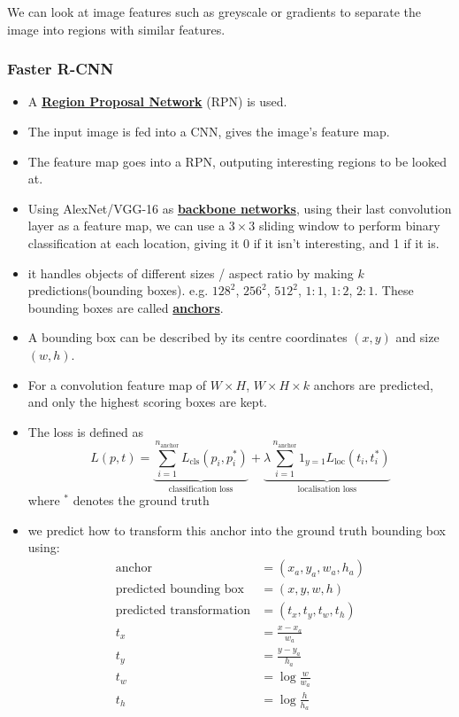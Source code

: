 \documentclass[twocolumn,landscape,10pt]{article}
\theoremstyle{definition}
\begin{document}
We can look at image features such as greyscale or gradients to separate the
image into regions with similar features.

\subsubsection{Faster R-CNN}

\begin{itemize}
    \item A \underline{\textbf{Region Proposal Network}} (RPN) is used.
    \item The input image is fed into a CNN, gives the image's feature map.
    \item The feature map goes into a RPN, outputing interesting regions to be
        looked at.
    \item Using AlexNet/VGG-16 as \underline{\textbf{backbone networks}}, using
        their last convolution layer as a feature map, we can use a $3\times 3$
        sliding window to perform binary classification at each location,
        giving it 0 if it isn't interesting, and 1 if it is.
    \item it handles objects of different sizes / aspect ratio by making $k$
        predictions(bounding boxes). e.g. $128^2$, $256^2$, $512^2$, $1:1$,
        $1:2$, $2:1$. These bounding boxes are called
        \underline{\textbf{anchors}}.
    \item A bounding box can be described by its centre coordinates $(x,y)$ and
        size $(w,h)$.
    \item For a convolution feature map of $W\times H$, $W\times H \times k$
        anchors are predicted, and only the highest scoring boxes are kept.
    \item The loss is defined as
        \[
            L(p,t) = \underbrace {\sum_{i=1}^{n_\text{anchor}} 
            L_\text{cls}(p_i,p_i^*)}_{\text{classification loss}} +
            \underbrace{\lambda\sum_{i=1}^{n_\text{anchor}}
            1_{y=1}L_\text{loc}(t_i,t_i^*)}_{\text{localisation loss}}
        \]
        where $^*$ denotes the ground truth
    \item we predict how to transform this anchor into the ground truth bounding
        box using:
        \begin{align*}
            \text{anchor} & = (x_a, y_a, w_a, h_a) \\
            \text{predicted bounding box} & = (x,y,w,h) \\
            \text{predicted transformation} & = (t_x,t_y,t_w,t_h) \\
            t_x & = \frac{x-x_a}{w_a} \\
            t_y & = \frac{y-y_a}{h_a} \\
            t_w & = \log{\frac{w}{w_a}} \\
            t_h & = \log{\frac{h}{h_a}}
        \end{align*} 
\end{itemize} 
\end{document}
